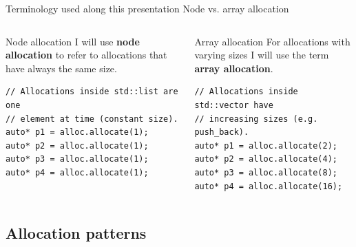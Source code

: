 \documentclass[10pt,aspectratio=169]{beamer}
\begin{document}
\begin{frame}[fragile]
{Terminology used along this presentation}
{Node vs. array allocation}
\begin{columns}
\begin{column}{0.45\textwidth}

\begin{block} {Node allocation}
I will use {\bf \color{alertc} node allocation} to refer to
allocations that have always the same size.
\end{block}
\vspace{0.5cm}
\begin{lstlisting}
// Allocations inside std::list are one
// element at time (constant size).
auto* p1 = alloc.allocate(1);
auto* p2 = alloc.allocate(1);
auto* p3 = alloc.allocate(1);
auto* p4 = alloc.allocate(1);
\end{lstlisting}

\end{column}

\begin{column}{0.45\textwidth}
\begin{block} {Array allocation}
For allocations with varying sizes I will use the term {\bf \color{alertc} array allocation}.
\end{block}
\vspace{0.5cm}
\begin{lstlisting}
// Allocations inside std::vector have
// increasing sizes (e.g. push_back).
auto* p1 = alloc.allocate(2);
auto* p2 = alloc.allocate(4);
auto* p3 = alloc.allocate(8);
auto* p4 = alloc.allocate(16);
\end{lstlisting}
\end{column}
\end{columns}
\end{frame}

\subsection{Allocation patterns}
\end{document}

